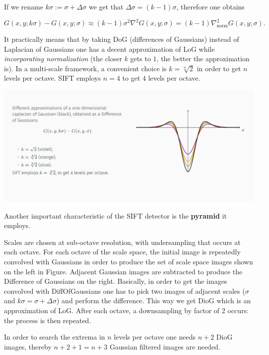 \documentclass[10pt]{report}
\begin{document}
If we rename \(k\sigma := \sigma + \Delta \sigma\) we get that
\(\Delta \sigma = (k - 1)\sigma\), therefore one obtains

\[G(x, y; k\sigma) - G(x, y; \sigma) \approx (k-1)\sigma^2 \nabla^2 G(x, y;\sigma) = (k-1)\nabla^2_{\mbox{norm}}G(x, y;\sigma).\]

It practically means that by taking DoG (differences of Gaussians)
instead of Laplacian of Gaussians one has a decent approximation of LoG
while \emph{incorporating normalization} (the closer \(k\) gets to \(1\), the
better the approximation is). In a multi-scale framework, a convenient
choice is \(k=\sqrt[n]{2}\) in order to get \(n\) levels per octave.
SIFT employs \(n = 4\) to get \(4\) levels per octave.

\begin{center}
\includegraphics[width=.9\linewidth]{./pics/det/difference-of-gaussians.jpg}
\end{center}

Another important characteristic of the SIFT detector is the \textbf{pyramid}
it employs.

Scales are chosen at sub-octave resolution, with undersampling that
occurs at each octave. For each octave of the scale space, the initial
image is repeatedly convolved with Gaussians in order to produce the set
of scale space images shown on the left in Figure. Adjacent Gaussian
images are subtracted to produce the Difference of Gaussians on the
right. Basically, in order to get the images convolved with
DiffOfGaussians one has to pick two images of adjacent scales
(\(\sigma\) and \(k\sigma = \sigma + \Delta \sigma\)) and perform the
difference. This way we get DioG which is an approximation of LoG. After
each octave, a downsampling by factor of \(2\) occurs: the process is
then repeated.

In order to search the extrema in \(n\) levels per octave one needs
\(n+2\) DioG images, thereby \(n+2+1=n+3\) Gaussian filtered images are
needed.
\end{document}
